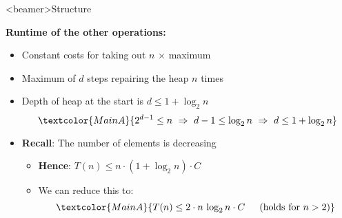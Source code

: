 \setcounter{subsubsection}{0}

\begin{frame}<beamer>{Structure}
\end{frame}

\begin{frame}
  \textbf{Runtime of the other operations:}
  \begin{itemize}
    \item<2- |handout:1>
      Constant costs for taking out {\color{MainA}$n$} $\times$ maximum
    \item<3- |handout:1>
      Maximum of {\color{MainA}$d$} steps repairing the heap
      {\color{MainA}$n$} times
    \item<4- |handout:1>
      Depth of heap at the start is {\color{MainA}$d \leq 1 + \log_2 n$}
      \begin{displaymath}
        \textcolor{MainA}{
          2^{d-1} \leq n
          ~\Rightarrow~
          d - 1 \leq \log_2 n
          ~\Rightarrow~
          d \leq 1 + \log_2 n
        }
      \end{displaymath}
    \item<5- |handout:1>
      \textbf{Recall}: The number of elements is decreasing
      \begin{itemize}
        \item<6- |handout:1>
          \textbf{Hence}:
          {\color{MainA}$T(n) \leq n \cdot (1 +\log_2 n) \cdot C$}
        \item<7- |handout:1>
          We can reduce this to:
          \begin{displaymath}
            \textcolor{MainA}{
              T(n) \leq 2 \cdot n  \, \log_2 n \cdot C
              \hspace{1.5em} (\text{holds for}~n > 2)
            }
          \end{displaymath}
      \end{itemize}
  \end{itemize}
\end{frame}


